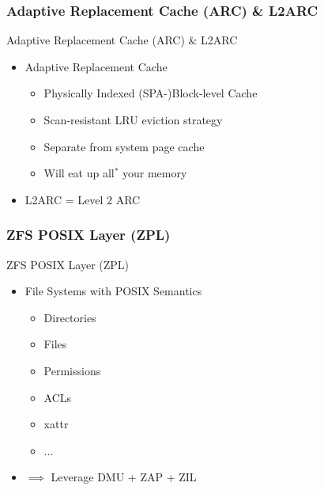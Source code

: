 \subsubsection{Adaptive Replacement Cache (ARC) \& L2ARC}
\begin{frame}{Adaptive Replacement Cache (ARC) \& L2ARC}
\begin{itemize}
	\item Adaptive Replacement Cache
	\begin{itemize}
		\item Physically Indexed (SPA-)Block-level Cache %
		\item Scan-resistant LRU eviction strategy %
		\item Separate from system page cache %
		\item Will eat up all$^*$ your memory
	\end{itemize}
	\item L2ARC = Level 2 ARC %
\end{itemize}
\end{frame}

\subsubsection{ZFS POSIX Layer (ZPL)}
\begin{frame}{ZFS POSIX Layer (ZPL)}
	\begin{itemize}
		\item File Systems with POSIX Semantics
		\pause
		\begin{itemize}
			\item Directories
			\item Files
			\item Permissions
			\item ACLs
			\item xattr
			\item ...
		\end{itemize}
		\pause
		\item $\implies$ Leverage DMU + ZAP + ZIL
	\end{itemize}
\end{frame}

